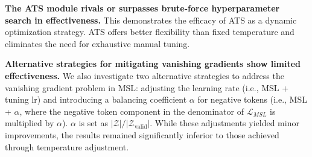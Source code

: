 \documentclass[sigconf,natbib=true]{acmart}
\begin{document}
\textbf{The ATS module rivals or surpasses brute-force hyperparameter search in effectiveness.} This demonstrates the efficacy of ATS as a dynamic optimization strategy. ATS offers better flexibility than fixed temperature and eliminates the need for exhaustive manual tuning.

\textbf{Alternative strategies for mitigating vanishing gradients show limited effectiveness.} We also investigate two alternative strategies to address the vanishing gradient problem in MSL: adjusting the learning rate (i.e., MSL + tuning lr) and introducing a balancing coefficient \(\alpha\) for negative tokens (i.e., MSL + \(\alpha\), where the negative token component in the denominator of \(\mathcal{L}_{MSL}\) is multiplied by \(\alpha\)). 
\(\alpha\) is set as \(|\mathcal{Z}| / |\mathcal{Z}_{\text{valid}}|\).
While these adjustments yielded minor improvements, the results remained significantly inferior to those achieved through temperature adjustment. 
\end{document}
